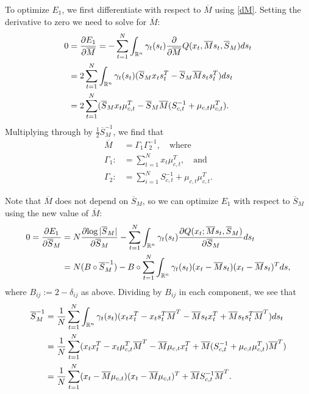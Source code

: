\documentclass[12pt,leqno]{article}
\begin{document}
To optimize $E_1$, we first differentiate with respect to $\overline{M}$ using \eqref{dM}.
Setting the derivative to zero we need to solve for $\overline{M}$:
\begin{align*}
  0 &= \frac{\partial{E_1}}{\partial\overline{M}}
  = -\sum_{t=1}^N\int_{{\mathbb R}^n}\gamma_t(s_t)\frac{\partial}{\partial\overline{M}}Q(x_t,\overline{M}s_t,\overline{S}_M)ds_t\\
  &= 2\sum_{t=1}^N\int_{{\mathbb R}^n}\gamma_t(s_t)(\overline{S}_Mx_ts_t^T - \overline{S}_M\overline{M}s_ts_t^T)ds_t\\
  &= 2\sum_{t=1}^N(\overline{S}_Mx_t\mu_{c,t}^T - \overline{S}_M\overline{M}(S_{c,t}^{-1} + \mu_{c,t}\mu_{c,t}^T).
\end{align*}
Multiplying through by $\frac{1}{2}\overline{S}_M^{-1}$, we find that
\begin{equation}\label{M_bar}
  \begin{split}
    \overline{M} &= \Gamma_1\Gamma_2^{-1}, \quad\text{where}\\
    \Gamma_1 :&= \sum_{t=1}^Nx_t\mu_{c,t}^T, \quad\text{and}\\
    \Gamma_2 :&= \sum_{i=1}^NS_{c,t}^{-1} + \mu_{c,t}\mu_{c,t}^T.
  \end{split}
\end{equation}

Note that $\overline{M}$ does not depend on $\overline{S}_M$, so we can optimize $E_1$ with respect to $\overline{S}_M$
using the new value of $\overline{M}$:
\begin{align*}
  0 = \frac{\partial{E_1}}{\partial{\overline{S}_M}} &=
   N\frac{\partial{\log|\overline{S}_M|}}{\partial\overline{S}_M}
  - \sum_{t=1}^N\int_{{\mathbb R}^n}\gamma_t(s_t)\frac{\partial{Q(x_t;\overline{M}s_t,\overline{S}_M)}}{\partial{\overline{S}_M}}ds_t \\
  &= N(B\circ\overline{S}_M^{-1}) - B\circ\sum_{t=1}^N
  \int_{{\mathbb R}^n}\gamma_t(s_t)(x_t-\overline{M}s_t)(x_t-\overline{M}s_t)^Tds,
\end{align*}
where $B_{ij} := 2-\delta_{ij}$ as above.  Dividing by $B_{ij}$ in each component, we see that
\begin{equation}\label{S_x}
  \begin{split}
    \overline{S}_M^{-1} &= \frac{1}{N}\sum_{t=1}^N\int_{{\mathbb R}^n}\gamma_t(s_t)(x_tx_t^T - x_ts_t^T\overline{M}^T
    - \overline{M}s_tx_t^T + \overline{M}s_ts_t^T\overline{M}^T)ds_t \\
    &= \frac{1}{N}\sum_{t=1}^N(x_tx_t^T - x_t\mu_{c,t}^T\overline{M}^T - \overline{M}\mu_{c,t}x_t^T +
    \overline{M}(S_{c,t}^{-1}+\mu_{c,t}\mu_{c,t}^T)\overline{M}^T)\\
    &= \frac{1}{N}\sum_{t=1}^N(x_t-\overline{M}\mu_{c,t})(x_t-\overline{M}\mu_{c,t})^T +
    \overline{M}S_{c,t}^{-1}\overline{M}^T.
  \end{split}
\end{equation}
\end{document}
